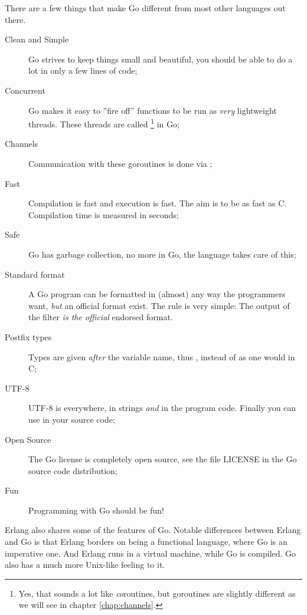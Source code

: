 \noindent{}There are a few things that make Go different from most other
languages out there.
\begin{description}
\item[Clean and Simple]
Go strives to keep things small and beautiful, you should
be able to do a lot in only a few lines of code;
\item[Concurrent]
Go makes it easy to ''fire off'' functions to be
run as \emph{very} lightweight threads. These threads are called
 \footnote{Yes, that sounds a lot like
\emph{co}routines, but goroutines are slightly different as we will
see in chapter \ref{chap:channels}.} in Go;
\item[Channels] 
Communication with these goroutines is done
via  \cite{csp}\cite{hoare};

\item[Fast]
Compilation is fast and execution is fast. The aim is
to be as fast as C. Compilation time is measured in seconds;

\item[Safe]
Go has garbage collection, no more  in Go,
the language takes care of this;

\item[Standard format]
A Go program can be formatted in (almost) any way the programmers want,
\emph{but} an official format exist. The rule is very simple:
The output of the filter  \emph{is the official} endorsed
format.

\item[Postfix types]
Types are given \emph{after} the variable name, thus ,
instead of  as one would in C;

\item[UTF-8]
UTF-8 is everywhere, in strings
\emph{and} in the program code. Finally you can use  in your source code;

\item[Open Source]
The Go license is completely open source, see the file LICENSE in the Go
source code distribution;

\item[Fun]
Programming with Go should be fun!

\end{description}
Erlang \cite{erlang} also shares some
of the features of Go. Notable differences between Erlang
and Go is that Erlang borders on being a functional language,
where Go is an imperative one. And Erlang runs in a virtual
machine, while Go is compiled. Go also has a much more Unix-like
feeling to it.

